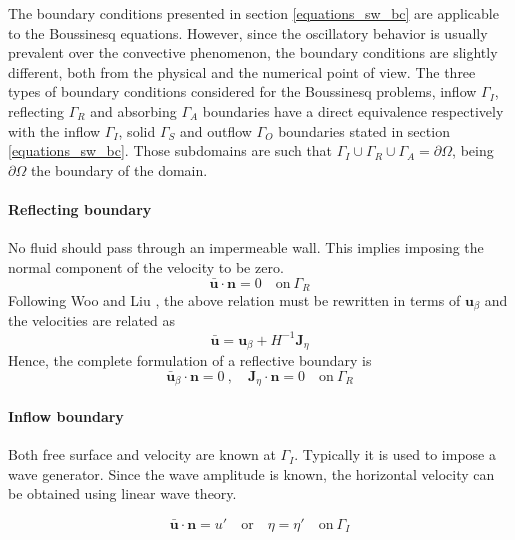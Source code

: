 The boundary conditions presented in section \ref{equations_sw_bc} are applicable to the Boussinesq equations.
However, since the oscillatory behavior is usually prevalent over the convective phenomenon, the boundary conditions are slightly different, both from the physical and the numerical point of view.
The three types of boundary conditions considered for the Boussinesq problems, inflow $\Gamma_I$, reflecting $\Gamma_R$ and absorbing $\Gamma_A$ boundaries have a direct equivalence respectively with the inflow $\Gamma_I$, solid $\Gamma_S$ and outflow $\Gamma_O$ boundaries stated in section \ref{equations_sw_bc}. Those subdomains are such that $\Gamma_I \cup \Gamma_R \cup \Gamma_A = \partial \Omega$, being $\partial\Omega$ the boundary of the domain.



\paragraph{Reflecting boundary} No fluid should pass through an impermeable wall. This implies imposing the normal component of the velocity to be zero.
\begin{equation*}
    \bar{\mathbf{u}} \cdot \mathbf{n} = 0 \quad \text{on} \ \Gamma_R
\end{equation*}
Following Woo and Liu \cite{woo2004a}, the above relation must be rewritten in terms of $\mathbf{u}_\beta$ and the velocities are related as
\begin{equation*}
    \bar{\mathbf{u}} = \mathbf{u}_\beta + H^{-1} \mathbf{J}_\eta
\end{equation*}
Hence, the complete formulation of a reflective boundary is
\begin{equation}
    \bar{\mathbf{u}}_\beta \cdot \mathbf{n} = 0 \ , \quad
    \mathbf{J}_\eta \cdot \mathbf{n} = 0 \quad
    \text{on} \ \Gamma_R
\end{equation}


\paragraph{Inflow boundary} Both free surface and velocity are known at $\Gamma_I$. Typically it is used to impose a wave generator. Since the wave amplitude is known, the horizontal velocity can be obtained using linear wave theory.

\begin{equation*}
    \bar{\mathbf{u}} \cdot \mathbf{n} =u' \quad \text{or}\quad \eta=\eta' \quad \text{on} \ \Gamma_I %
\end{equation*}

